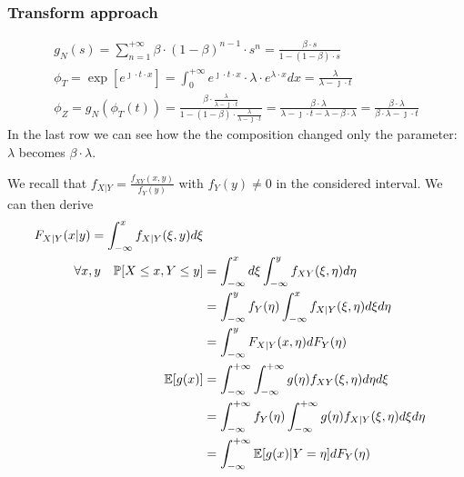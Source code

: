 \subsubsection{Transform approach}
\begin{equation}
  \begin{split}
  g_N(s)=\sum \limits_{n=1}^{+\infty} \beta \cdot (1-\beta)^{n-1}\cdot s^n = \frac{\beta \cdot s}{1-(1-\beta)\cdot s}\\
  \phi_T=\exp[e^{\jmath \cdot t \cdot x}] = \int_{0}^{+\infty} e^{\jmath \cdot t \cdot x} \cdot \lambda \cdot e^{ \lambda \cdot x} dx = \frac{\lambda}{\lambda - \jmath \cdot t} \\
  \phi_Z = g_N(\phi_T(t))=\frac{\beta \cdot \frac{\lambda}{\lambda - \jmath \cdot t}}{1-(1-\beta)\cdot \frac{\lambda}{\lambda - \jmath \cdot t}} =
   \frac{\beta \cdot \lambda}{\lambda - \jmath \cdot t -\lambda - \beta \cdot \lambda} = \frac{\beta \cdot \lambda}{\beta \cdot \lambda - \jmath \cdot t}
  \end{split}
\end{equation}
In the last row we can see how the the composition changed only the parameter: $\lambda$ becomes $\beta \cdot \lambda$.

We recall that $f_{X|Y} = \frac{f_{XY}(x,y)}{f_Y(y)}$ with $f_Y(y)\neq 0$ in the considered interval.
We can then derive
\begin{equation}
  \begin{split}
  F_{X|Y}(x|y) = \int_{-\infty}^{x}f_{X|Y}(\xi,y)d\xi\\
  \forall x,y \quad \mathbb{P}[X \le x , Y \le y] &= \int_{-\infty}^{x}d\xi \int_{-\infty}^{y}f_{XY}(\xi,\eta) d\eta\\
  &=\int_{-\infty}^{y}f_Y(\eta) \int_{-\infty}^{x}f_{X|Y}(\xi,\eta) d\xi d\eta \\
  &=\int_{-\infty}^{y}F_{X|Y}(x,\eta) dF_Y(\eta)\\
  \mathbb{E}[g(x)] &= \int_{-\infty}^{+\infty} \int_{-\infty}^{+\infty}g(\eta) f_{XY}(\xi,\eta) d\eta  d\xi \\
  &= \int_{-\infty}^{+\infty} f_Y(\eta) \int_{-\infty}^{+\infty}g(\eta) f_{X|Y}(\xi,\eta)   d\xi d\eta \\
  &= \int_{-\infty}^{+\infty}\mathbb{E}[g(x)|Y=\eta] dF_Y(\eta)
  \end{split}
\end{equation}
